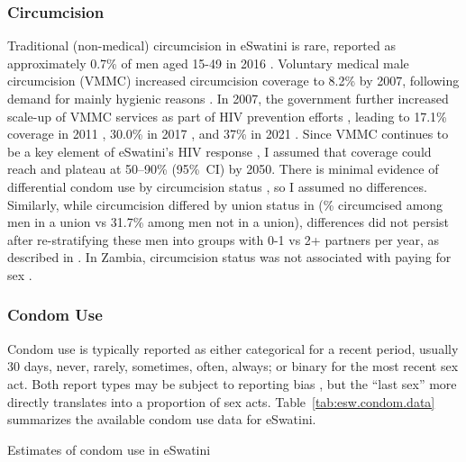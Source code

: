 \subsubsection{Circumcision}\label{model.par.tm.circ}
Traditional (non-medical) circumcision in eSwatini is rare,
reported as approximately 0.7\% of men aged 15-49 in 2016 \cite{SHIMS2}.
Voluntary medical male circumcision (VMMC) increased circumcision coverage to 8.2\% by 2007,
following demand for mainly hygienic reasons \cite{SDHS2006}.
In 2007, the government further increased scale-up of VMMC services
as part of HIV prevention efforts \cite{SDHS2006}, leading to
17.1\% coverage in 2011 \cite{SHIMS1},
30.0\% in 2017 \cite{SHIMS2}, and
37\% in 2021 \cite{EswCOP21}.
Since VMMC continues to be a key element of eSwatini's HIV response \cite{EswCOP21},
I assumed that coverage could reach and plateau at 50--90\% (95\%~CI) by 2050.
There is minimal evidence of differential condom use by circumcision status \cite{SHIMS1},
so I assumed no differences.
Similarly, while circumcision differed by union status in \cite{SHIMS2}
(\% circumcised among men in a union vs 31.7\% among men not in a union),
differences did not persist after re-stratifying these men
into groups with 0-1 vs 2+ partners per year, as described in .
In Zambia, circumcision status was not associated with paying for sex \cite{Carrasco2020}.
\subsubsection{Condom Use}\label{model.par.tm.condom}
Condom use is typically reported as either
categorical for a recent period, usually 30 days, \eg never, rarely, sometimes, often, always; or
binary for the most recent sex act.
Both report types may be subject to reporting bias \cite{Cordero-Coma2012},
but the ``last sex'' more directly translates into a proportion of sex acts.
Table~\ref{tab:esw.condom.data} summarizes the available condom use data for eSwatini.
\begin{table}
  \centering
  \caption{Estimates of condom use in eSwatini}
  \label{tab:esw.condom.data}
  
\end{table}
